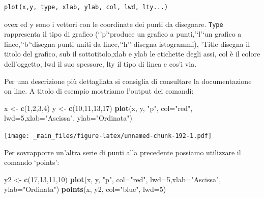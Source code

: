 \documentclass[a4paper,12pt,oneside]{book}
\newenvironment{Shaded}{\begin{snugshade}}{\end{snugshade}}
\newcommand{\KeywordTok}[1]{\textcolor[rgb]{0.13,0.29,0.53}{\textbf{#1}}}
\newcommand{\DataTypeTok}[1]{\textcolor[rgb]{0.13,0.29,0.53}{#1}}
\newcommand{\DecValTok}[1]{\textcolor[rgb]{0.00,0.00,0.81}{#1}}
\newcommand{\StringTok}[1]{\textcolor[rgb]{0.31,0.60,0.02}{#1}}
\newcommand{\NormalTok}[1]{#1}
\theoremstyle{definition}
\theoremstyle{definition}
\theoremstyle{definition}
\theoremstyle{remark}
\begin{document}
\begin{verbatim}
plot(x,y, type, xlab, ylab, col, lwd, lty...)
\end{verbatim}

ovex ed y sono i vettori con le coordinate dei punti da disegnare.
\texttt{Type} rappresenta il tipo di grafico (`'p'`produce un grafico a
punti,'`l'`un grafico a linee,'`b'`disegna punti uniti da linee,'`h''
disegna istogrammi), 'Title disegna il titolo del grafico, sub il
sottotitolo,xlab e ylab le etichette degli assi, col è il colore
dell'oggetto, lwd il suo spessore, lty il tipo di linea e cos'i via.

Per una descrizione più dettagliata si consiglia di consultare la
documentazione on line. A titolo di esempio mostriamo l'output dei
comandi:

\begin{Shaded}
\begin{Highlighting}[]
\NormalTok{x  <-}\StringTok{  }\KeywordTok{c}\NormalTok{(}\DecValTok{1}\NormalTok{,}\DecValTok{2}\NormalTok{,}\DecValTok{3}\NormalTok{,}\DecValTok{4}\NormalTok{)}
\NormalTok{y  <-}\StringTok{  }\KeywordTok{c}\NormalTok{(}\DecValTok{10}\NormalTok{,}\DecValTok{11}\NormalTok{,}\DecValTok{13}\NormalTok{,}\DecValTok{17}\NormalTok{)}
\KeywordTok{plot}\NormalTok{(x, y, }\StringTok{"p"}\NormalTok{, }\DataTypeTok{col=}\StringTok{"red"}\NormalTok{, }\DataTypeTok{lwd=}\DecValTok{5}\NormalTok{,}\DataTypeTok{xlab=}\StringTok{"Ascissa"}\NormalTok{, }\DataTypeTok{ylab=}\StringTok{"Ordinata"}\NormalTok{)}
\end{Highlighting}
\end{Shaded}

\texttt{[image: \_main\_files/figure-latex/unnamed-chunk-192-1.pdf]}

Per sovrapporre un'altra serie di punti alla precedente possiamo
utilizzare il comando `points':

\begin{Shaded}
\begin{Highlighting}[]
\NormalTok{y2  <-}\StringTok{  }\KeywordTok{c}\NormalTok{(}\DecValTok{17}\NormalTok{,}\DecValTok{13}\NormalTok{,}\DecValTok{11}\NormalTok{,}\DecValTok{10}\NormalTok{)}
\KeywordTok{plot}\NormalTok{(x, y, }\StringTok{"p"}\NormalTok{, }\DataTypeTok{col=}\StringTok{"red"}\NormalTok{, }\DataTypeTok{lwd=}\DecValTok{5}\NormalTok{,}\DataTypeTok{xlab=}\StringTok{"Ascissa"}\NormalTok{, }\DataTypeTok{ylab=}\StringTok{"Ordinata"}\NormalTok{)}
\KeywordTok{points}\NormalTok{(x, y2, }\DataTypeTok{col=}\StringTok{"blue"}\NormalTok{, }\DataTypeTok{lwd=}\DecValTok{5}\NormalTok{)}
\end{Highlighting}
\end{Shaded}
\end{document}
